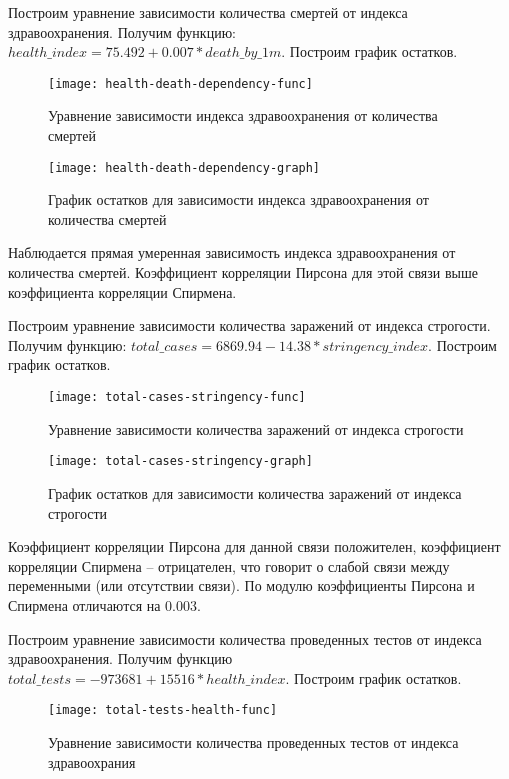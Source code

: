 \documentclass[a4paper,14pt]{extarticle}
\begin{document}
Построим уравнение зависимости количества смертей от индекса здравоохранения.
Получим функцию: $health\_index = 75.492 + 0.007 * death\_by\_1m$. Построим
график остатков.
\begin{figure}[H]
    \centering
    \texttt{[image: health-death-dependency-func]}
    \caption{Уравнение зависимости индекса здравоохранения от количества смертей}
    \label{fig:health-death-dependency-func}
\end{figure}

\begin{figure}[H]
    \centering
    \texttt{[image: health-death-dependency-graph]}
    \caption{График остатков для зависимости индекса здравоохранения от количества смертей}
    \label{fig:health-death-dependency-graph}
\end{figure}
Наблюдается прямая умеренная зависимость индекса здравоохранения от количества
смертей. Коэффициент корреляции Пирсона для этой связи выше коэффициента
корреляции Спирмена.

\pagebreak

Построим уравнение зависимости количества заражений от индекса
строгости. Получим функцию: $total\_cases = 6869.94 - 14.38 * stringency\_index$.
Построим график остатков.
\begin{figure}[H]
    \centering
    \texttt{[image: total-cases-stringency-func]}
    \caption{Уравнение зависимости количества заражений от индекса строгости}
    \label{fig:total-cases-stringency-func}
\end{figure}

\begin{figure}[H]
    \centering
    \texttt{[image: total-cases-stringency-graph]}
    \caption{График остатков для зависимости количества заражений от индекса строгости}
    \label{fig:total-cases-stringency-graph}
\end{figure}
Коэффициент корреляции Пирсона для данной связи положителен, коэффициент
корреляции Спирмена -- отрицателен, что говорит о слабой связи между переменными
(или отсутствии связи). По модулю коэффициенты Пирсона и Спирмена отличаются на
0.003.
\pagebreak

Построим уравнение зависимости количества проведенных тестов от индекса
здравоохранения. Получим функцию $total\_tests = -973681 + 15516 *
health\_index$. Построим график остатков.
\begin{figure}[H]
    \centering
    \texttt{[image: total-tests-health-func]}
    \caption{Уравнение зависимости количества проведенных тестов от индекса здравоохрания}
    \label{fig:total-tests-health-func}
\end{figure}
\end{document}
